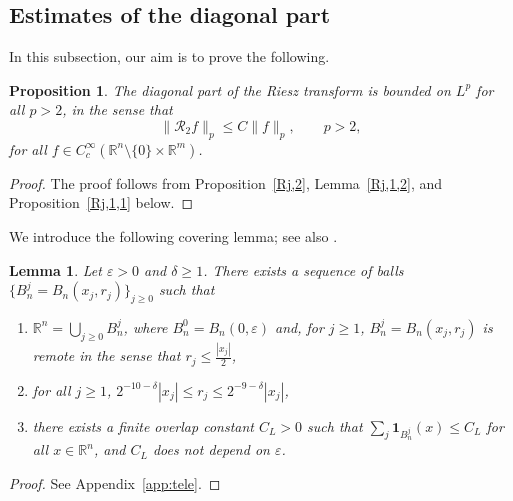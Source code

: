 \documentclass[12pt]{amsart}
\newtheorem{proposition}[theorem]{Proposition}
\newtheorem{lemma}[theorem]{Lemma}
\begin{document}
\subsection{Estimates of the diagonal part}




In this subsection, our aim is to prove the following.

\begin{proposition}\label{R2}
The diagonal part of the Riesz transform is bounded on $L^p$ for all $p>2$, in the sense that
\begin{equation*}
    \|\mathcal{R}_2f\|_p \le C \|f\|_p,\qquad p>2,
\end{equation*}
for all $f\in C_c^\infty(\mathbb{R}^n \setminus \{0\} \times \mathbb{R}^m)$.
\end{proposition}

\begin{proof}
The proof follows from Proposition~\ref{Rj,2}, Lemma~\ref{Rj,1,2}, and Proposition~\ref{Rj,1,1} below.
\end{proof}

We introduce the following covering lemma; see also \cite{Gilles}.

\begin{lemma}\label{lemma_remotecover}
Let $\varepsilon>0$ and $\delta \ge 1$. There exists a sequence of balls $\{B_n^j = B_n(x_j, r_j)\}_{j \ge 0}$ such that
\begin{enumerate}[label=(\roman*)]
    \item\label{(1)} $\mathbb{R}^n = \bigcup_{j\ge 0} B_n^j$, where $B_n^0 = B_n(0,\varepsilon)$ and, for $j\ge 1$, $B_n^j = B_n(x_j,r_j)$ is remote in the sense that $r_j \le \frac{|x_j|}{2}$,
    \item\label{(2)} for all $j \ge 1$, $2^{-10-\delta}|x_j|\le r_j \le 2^{-9-\delta} |x_j|$,
    \item\label{(3)} there exists a finite overlap constant $C_L>0$ such that $\sum_j \mathbf{1}_{B_n^j}(x) \le C_L$ for all $x\in \mathbb{R}^n$, and $C_L$ does not depend on $\varepsilon$.
\end{enumerate}
\end{lemma}


\begin{proof}
See Appendix~\ref{app:tele}.
\end{proof}
\end{document}
